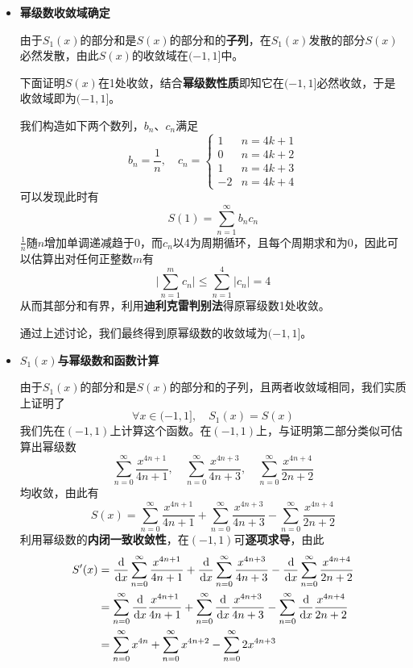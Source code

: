 \documentclass[a4paper,UTF8,fontset=windows,AutoFakeBold]{ctexart}
\newcommand*{\dr}{\hspace{0.07em}\mathrm{d}}
\newcommand*{\suminf}[1][n=1]{\sum_{#1}^\infty}
\theoremstyle{ex}
\begin{document}
\begin{framed}
{\begin{itemize}
        对第二个数项级数，通分得到其为
        $$\suminf[n=0]\frac{8n+5}{(4n+1)(4n+3)(2n+2)}$$
        这也是一个\textbf{正项级数}，且有$n\ge1$时
        $$\frac{8n+5}{(4n+1)(4n+3)(2n+2)}\le\frac{13n}{(4n)^2\cdot2n}\le\frac{13}{32}\cdot\frac{1}{n^2}$$
        由\textbf{$p$级数}敛散性结论与数项级数基本性质可知$\suminf\frac{13}{32n^2}$收敛，于是根据\textbf{比较判别法}得左侧也收敛，这就说明了$S_1(1)$、$S_2(1)$收敛。
        
        综合以上讨论，$S_1(x)$与$S_2(x)$的收敛域均为$(-1,1]$。

        \item \textbf{幂级数收敛域确定}
        
        由于$S_1(x)$的部分和是$S(x)$的部分和的\textbf{子列}，在$S_1(x)$发散的部分$S(x)$必然发散，由此$S(x)$的收敛域在$(-1,1]$中。

        下面证明$S(x)$在1处收敛，结合\textbf{幂级数性质}即知它在$(-1,1]$必然收敛，于是收敛域即为$(-1,1]$。

        我们构造如下两个数列，$b_n$、$c_n$满足
        $$b_n=\frac{1}{n},\quad c_n=\begin{cases}1&n=4k+1\\0&n=4k+2\\1&n=4k+3\\-2&n=4k+4\end{cases}$$
        可以发现此时有
        $$S(1)=\suminf b_nc_n$$
        $\frac{1}{n}$随$n$增加单调递减趋于0，而$c_n$以4为周期循环，且每个周期求和为0，因此可以估算出对任何正整数$m$有
        $$\bigg|\sum_{n=1}^mc_n\bigg|\le\sum_{n=1}^{4}|c_n|=4$$
        从而其部分和有界，利用\textbf{迪利克雷判别法}得原幂级数1处收敛。

        通过上述讨论，我们最终得到原幂级数的收敛域为$(-1,1]$。

        \item \textbf{$S_1(x)$与幂级数和函数计算}
        
        由于$S_1(x)$的部分和是$S(x)$的部分和的子列，且两者收敛域相同，我们实质上证明了
        $$\forall x\in(-1,1],\quad S_1(x)=S(x)$$
        我们先在$(-1,1)$上计算这个函数。在$(-1,1)$上，与证明第二部分类似可估算出幂级数
        $$\suminf[n=0]\frac{x^{4n+1}}{4n+1},\quad\suminf[n=0]\frac{x^{4n+3}}{4n+3},\quad\suminf[n=0]\frac{x^{4n+4}}{2n+2}$$
        均收敛，由此有
        $$S(x)=\suminf[n=0]\frac{x^{4n+1}}{4n+1}+\suminf[n=0]\frac{x^{4n+3}}{4n+3}-\suminf[n=0]\frac{x^{4n+4}}{2n+2}$$
        利用幂级数的\textbf{内闭一致收敛性}，在$(-1,1)$可\textbf{逐项求导}，由此
        $$\begin{aligned}S'(x)&=\frac{\dr}{\dr x}\suminf[n=0]\frac{x^{4n+1}}{4n+1}+\frac{\dr}{\dr x}\suminf[n=0]\frac{x^{4n+3}}{4n+3}-\frac{\dr}{\dr x}\suminf[n=0]\frac{x^{4n+4}}{2n+2}\\ &=\suminf[n=0]\frac{\dr}{\dr x}\frac{x^{4n+1}}{4n+1}+\suminf[n=0]\frac{\dr}{\dr x}\frac{x^{4n+3}}{4n+3}-\suminf[n=0]\frac{\dr}{\dr x}\frac{x^{4n+4}}{2n+2}\\ &=\suminf[n=0]x^{4n}+\suminf[n=0]x^{4n+2}-\suminf[n=0]2x^{4n+3}\end{aligned}$$


\end{itemize}}
\end{framed}
\end{document}

